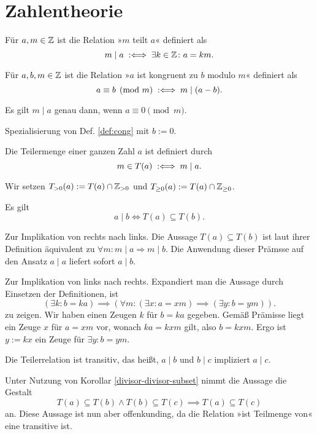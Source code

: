 
\chapter{Zahlentheorie}

\begin{Definition}[Teiler] Für $a,m\in\mathbb Z$ ist die Relation »$m$ teilt
$a$« definiert als
\[m\mid a\;:\Longleftrightarrow\; \exists k\in\mathbb Z\colon a = km.\]
\end{Definition}

\begin{Definition}[Kongruenz]\label{def:cong}
Für $a,b,m\in\mathbb Z$ ist die Relation »$a$ ist kongruent zu $b$ modulo
$m$« definiert als
\[a\equiv b \pmod m \;:\Longleftrightarrow\; m\mid (a-b).\]
\end{Definition}

\begin{Korollar}
Es gilt $m\mid a$ genau dann, wenn $a\equiv 0\pmod m$.
\end{Korollar}
\begin{Beweis}
Spezialisierung von Def. \ref{def:cong} mit $b:=0$.\,\qedsymbol
\end{Beweis}

\begin{Definition}[Teilermenge] Die Teilermenge
einer ganzen Zahl $a$ ist definiert durch
\[m\in T(a)\;:\Longleftrightarrow\; m\mid a.\]
\end{Definition}
 Wir setzen $T_{>0}(a):=T(a)\cap\mathbb Z_{>0}$ und
$T_{\ge 0}(a):=T(a)\cap\mathbb Z_{\ge 0}$.

\begin{Korollar}\label{divisor-divisor-subset} Es gilt
\[a\mid b \iff T(a)\subseteq T(b).\]
\end{Korollar}
\begin{Beweis}
Zur Implikation von rechts nach links.
Die Aussage $T(a)\subseteq T(b)$ ist laut ihrer Definition
äquivalent zu $\forall m\colon m\mid a\Rightarrow m\mid b$.
Die Anwendung dieser Prämsse auf den Ansatz $a\mid a$
liefert sofort $a\mid b$.

Zur Implikation von links nach rechts. Expandiert man die Aussage
durch Einsetzen der Definitionen, ist
\[(\exists k\colon b=ka)\implies
(\forall m\colon (\exists x\colon a=xm)\implies (\exists y\colon b=ym)).\]
zu zeigen. Wir haben einen Zeugen $k$ für $b=ka$ gegeben. 
Gemäß Prämisse liegt ein Zeuge $x$ für $a=xm$ vor, wonach $ka=kxm$
gilt, also $b=kxm$. Ergo ist $y:=kx$ ein Zeuge für
$\exists y\colon b=ym$.\,\qedsymbol
\end{Beweis}

\begin{Korollar}
Die Teilerrelation ist transitiv, das heißt,
$a\mid b$ und $b\mid c$ impliziert $a\mid c$.
\end{Korollar}
\begin{Beweis}
Unter Nutzung von Korollar \ref{divisor-divisor-subset}
nimmt die Aussage die Gestalt
\[T(a)\subseteq T(b)\land T(b)\subseteq T(c)\implies T(a)\subseteq T(c)\]
an. Diese Aussage ist nun aber offenkunding, da die Relation »ist
Teilmenge von« eine transitive ist.\,\qedsymbol
\end{Beweis}

